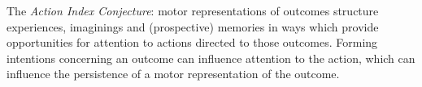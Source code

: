 \documentclass[12pt]{extarticle}
\begin{document}
\begin{multicols*}{3}
The \emph{Action Index Conjecture}:
motor representations of outcomes structure 
experiences, imaginings and (prospective) memories
in ways which provide opportunities for attention to actions directed to those outcomes.
Forming intentions concerning an outcome can influence attention to the action,
which can influence the persistence of a motor representation of the outcome.
    


\vfill



\footnotesize


\end{multicols*}
\end{document}
